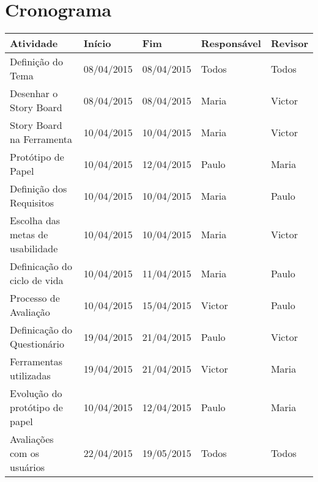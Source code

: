 \chapter[Cronograma]{Cronograma}

\begin{table}[h]
	\centering
	\begin{tabular}{@{}lllll@{}}
		\hline
		Atividade                       &    Início    &     Fim    & Responsável & Revisor \\ \hline
		Definição do Tema               &  08/04/2015  & 08/04/2015 & Todos       & Todos \\ \hline	
		Desenhar o Story Board          &  08/04/2015  & 08/04/2015 & Maria       & Victor \\ \hline	
		Story Board na Ferramenta       &  10/04/2015  & 10/04/2015 & Maria       & Victor \\ \hline
		Protótipo de Papel              &  10/04/2015  & 12/04/2015 & Paulo       & Maria \\ \hline	
		Definição dos Requisitos        &  10/04/2015  & 10/04/2015 & Maria       & Paulo \\ \hline	
		Escolha das metas de usabilidade&  10/04/2015  & 10/04/2015 & Maria       & Victor \\ \hline	
		Definicação do ciclo de vida    &  10/04/2015  & 11/04/2015 & Maria       & Paulo \\ \hline	
		Processo de Avaliação           &  10/04/2015  & 15/04/2015 & Victor      & Paulo \\ \hline	
		Definicação do Questionário     &  19/04/2015  & 21/04/2015 & Paulo       & Victor \\ \hline	
		Ferramentas utilizadas          &  19/04/2015  & 21/04/2015 & Victor      & Maria \\ \hline
		Evolução do protótipo de papel  &  10/04/2015  & 12/04/2015 & Paulo       & Maria \\ \hline
		Avaliações com os usuários      &  22/04/2015  & 19/05/2015 & Todos       & Todos \\ \hline
 		 
	\end{tabular}
\end{table}




